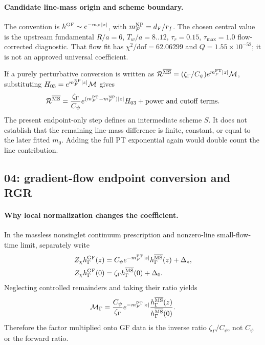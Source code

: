 \documentclass[11pt]{article}
\numberwithin{equation}{section}
\newcommand{\MSbar}{\overline{\mathrm{MS}}}
\begin{document}
\paragraph{Candidate line-mass origin and scheme boundary.}
The convention is \(h^{\rm GF}\sim e^{-m_F|z|}\), with
\(m_F^{\rm NP}=d_F/r_f\).  The chosen central value is the upstream
fundamental \(R/a=6\), \(T_w/a=8..12\), \(\tau_r=0.15\),
\(\tau_{\max}=1.0\) flow-corrected diagnostic.  That flow fit has
\(\chi^2/\mathrm{dof}=62.06299\) and \(Q=1.55\times10^{-52}\);
it is not an approved universal coefficient.

If a purely perturbative conversion is written as
\(\mathcal R^{\MSbar}=(\zeta_\Gamma/C_\psi)
e^{m_F^{\rm PT}|z|}\mathcal M\), substituting
\(H_{03}=e^{m_F^{\rm NP}|z|}\mathcal M\) gives
\begin{equation}
 \mathcal R^{\MSbar}
 =\frac{\zeta_\Gamma}{C_\psi}
 e^{(m_F^{\rm PT}-m_F^{\rm NP})|z|}H_{03}
 +\text{power and cutoff terms}.
\label{eq:l32x64-NP-PT-identity}
\end{equation}
The present endpoint-only step defines an intermediate scheme \(S\).
It does not establish that the remaining line-mass difference is finite,
constant, or equal to the later fitted \(m_0\).  Adding the full PT
exponential again would double count the line contribution.

\subsection{04: gradient-flow endpoint conversion and RGR}

\paragraph{Why local normalization changes the coefficient.}
In the massless nonsinglet continuum prescription and nonzero-line
small-flow-time limit, separately write
\begin{align}
 Z_\chi h_\Gamma^{\rm GF}(z)
 &=C_\psi e^{-m_F^{\rm PT}|z|}h_\Gamma^{\MSbar}(z)+\Delta_z,\\
 Z_\chi h_\Gamma^{\rm GF}(0)
 &=\zeta_\Gamma h_\Gamma^{\MSbar}(0)+\Delta_0.
\label{eq:l32x64-two-SFTEs}
\end{align}
Neglecting controlled remainders and taking their ratio yields
\begin{equation}
 \mathcal M_\Gamma=
 \frac{C_\psi}{\zeta_\Gamma}e^{-m_F^{\rm PT}|z|}
 \frac{h_\Gamma^{\MSbar}(z)}{h_\Gamma^{\MSbar}(0)}.
\label{eq:l32x64-normalized-SFTE}
\end{equation}
Therefore the factor multiplied onto GF data is the inverse ratio
\(\zeta_\Gamma/C_\psi\), not \(C_\psi\) or the forward ratio.
\end{document}
